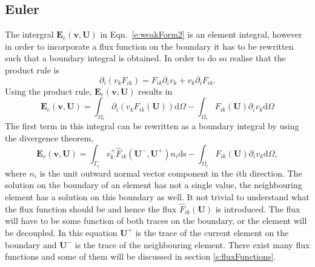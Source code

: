 \documentclass{report}
\begin{document}
\subsection{Euler}
\label{ss:Euler}
The intergral $\mathbf{E}_e(\mathbf{v},\mathbf{U})$ in Eqn.~\ref{e:weakForm2} is an element integral, however in order to incorporate a flux function on the boundary it has to be rewritten such that a boundary integral is obtained. In order to do so realise that the product rule is
\begin{equation}
\partial_i (v_k F_{ik}) = F_{ik} \partial_i v_k + v_k \partial_i F_{ik}.
\end{equation}
Using the product rule, $\mathbf{E}_e(\mathbf{v},\mathbf{U})$ results in
\begin{equation}
\mathbf{E}_e(\mathbf{v},\mathbf{U}) = 
\int_{\Omega_e} \partial_i (v_k {F}_{ik}(\mathbf{U})) \mathrm{d}\Omega
- \int_{\Omega_e} {F}_{ik}(\mathbf{U}) \partial_i v_k \mathrm{d}\Omega
\end{equation}
The first term in this integral can be rewritten as a boundary integral by using the divergence theorem,
\begin{equation}
\label{e:weakFormEuler}
\mathbf{E}_e(\mathbf{v},\mathbf{U}) = 
\int_{\Gamma_e} v_k^{+} \hat{F}_{ik}(\mathbf{U}^{-},\mathbf{U}^{+}) n_i \mathrm{ds}
- \int_{\Omega_e} {F}_{ik}(\mathbf{U}) \partial_i v_k \mathrm{d}\Omega,
\end{equation}
where $n_i$ is the unit outward normal vector component in the $i$th direction. The solution on the boundary of an element has not a single value, the neighbouring element has a solution on this boundary as well. It not trivial to understand what the flux function should be and hence the flux $\hat{F}_{ik}(\mathbf{U})$ is introduced. The flux will have to be some function of both traces on the boundary, or the element will be decoupled. In this equation $\mathbf{U}^{+}$ is the trace of the current element on the boundary and $\mathbf{U}^{-}$ is the trace of the neighbouring element. There exist many flux functions and some of them will be discussed in section \ref{s:fluxFunctions}.

\end{document}
